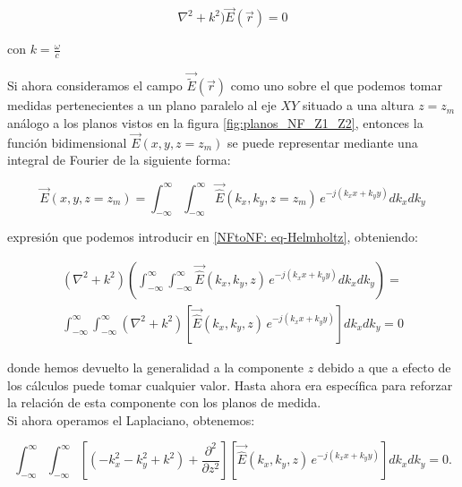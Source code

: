 \documentclass{article}
\begin{document}
\begin{equation}
\nabla^{2}+k^{2})\vec{E}(\vec{r})=0
\label{NFtoNF: eq-Helmholtz}
\end{equation}

con $k=\frac{\omega}{c}$

\newpage

Si ahora consideramos el campo $\vec{\tilde{E}}(\vec{r})$ como uno sobre el que podemos tomar medidas pertenecientes a un plano paralelo al eje $XY$ situado a una altura $z=z_{m}$ análogo a los planos vistos en la figura \ref{fig:planos_NF_Z1_Z2}, entonces la función bidimensional $\vec{E}(x,y,z=z_{m})$ se puede representar
mediante una integral de Fourier de la siguiente forma:

\begin{equation}
\vec{E}(x,y,z=z_{m})=\int_{-\infty}^{\infty}\int_{-\infty}^{\infty}\vec{\hat{E}}(k_{x},k_{y},z=z_{m})
\,e^{-j (k_{x} x+k_{y} y)} dk_{x} dk_{y}
\label{NFtoNF: eq-fourier-campo-electrico}
\end{equation}

expresión que podemos introducir en \eqref{NFtoNF: eq-Helmholtz}, obteniendo:

\begin{multline}
\left(\nabla^{2}+k^{2}\right)\left(\int_{-\infty}^{\infty}\int_{-\infty}^{\infty}\vec{\hat{E}}(k_{x},k_{y},z)
\,e^{-j (k_{x} x+k_{y} y)} dk_{x}
dk_{y}\right)=\\
\int_{-\infty}^{\infty}\int_{-\infty}^{\infty}\left(\nabla^{2}+k^{2}\right)\left[\vec{\hat{E}}(k_{x},k_{y},z)
\,e^{-j (k_{x} x+k_{y} y)}\right] dk_{x} dk_{y}=0
\label{NFtoNF: eq-fourier-campo-electrico-introducida-en-Helmholtz}
\end{multline}

donde hemos devuelto la generalidad a la componente $z$ debido a que a efecto de los cálculos puede tomar cualquier valor. Hasta ahora era específica para reforzar la relación de esta componente con los planos de medida.
\\

Si ahora operamos el Laplaciano, obtenemos:

\begin{equation}
\int_{-\infty}^{\infty}\int_{-\infty}^{\infty}\left[\left(-k_{x}^{2}-k_{y}^{2}+k^{2}\right)+\frac{\partial^{2}}{\partial
z^{2}}\right]\left[\vec{\hat{E}}(k_{x},k_{y},z) \,e^{-j (k_{x}
x+k_{y} y)}\right] dk_{x} dk_{y}=0.
\label{NFtoNF: eq-fourier-campo-electrico-introducida-en-Helmholtz-con-laplaciano-operado}
\end{equation}
\end{document}
